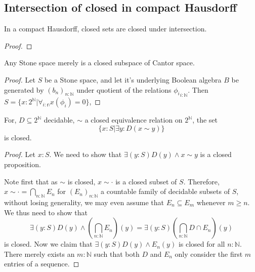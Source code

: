 \subsection{Intersection of closed in compact Hausdorff}

\begin{lemma}
  In a compact Hausdorff, closed sets are closed under intersection. 
\end{lemma}
\begin{proof}
  
\end{proof}



\begin{lemma}
  Any Stone space merely is a closed subspace of Cantor space. 
\end{lemma}
\begin{proof}
  Let $S$ be a Stone space, and let it's underlying Boolean algebra $B$ be generated by 
  $(b_n)_{n:\mathbb N}$ under quotient of the relations ${\phi_i}_{i:\mathbb N}$. 
  Then $S = \{ x: 2^\mathbb N | \forall_{i:\mathbb n} x(\phi_i) = 0\}$, 
\end{proof}


\begin{lemma}
  For, $D\subseteq 2^\mathbb N$ decidable, $\sim$ a closed equivalence relation on $2^\mathbb N$,
  the set $$\{x:S | \exists y : D (x\sim y)\}$$ is closed. 
\end{lemma}
\begin{proof}
  Let $x:S$. We need to show that $\exists (y:S) D(y) \wedge x \sim y$ is a closed proposition. 

  Note first that as $\sim $ is closed, $x \sim \cdot $ is a closed subset of $S$. 
  Therefore, $x\sim \cdot = \bigcap_{n:\mathbb N} E_n$ for $(E_n)_{n:\mathbb N}$ a
  countable family of decidable subsets of $S$, without losing generality, 
  we may even assume that $E_n \subseteq E_m$ whenever $m\geq n$. 
  We thus need to show that 
  $$
  \exists (y:S) D(y) \wedge (\bigcap_{n:\mathbb N} E_n)(y) 
  = 
  \exists (y:S) (\bigcap_{n:\mathbb N} D \cap  E_n)(y) 
  $$
  is closed. 
%
  Now we claim that 
  $\exists (y:S) D(y) \wedge E_n(y)$ is closed for all $n:\mathbb N$. 
  There merely exists an $m:\mathbb N$ such that both $D$ and $E_n$ only consider 
  the first $m$ entries of a sequence. 
  
\end{proof}



